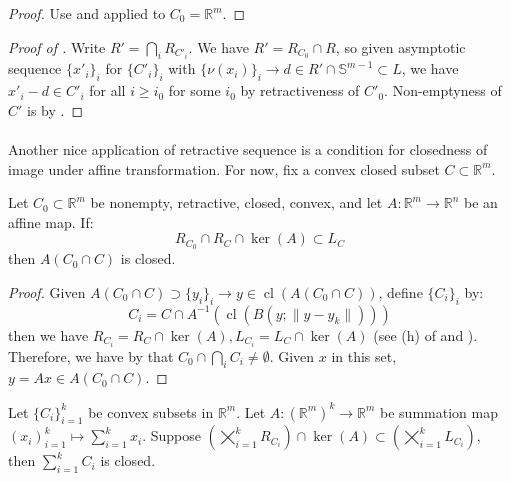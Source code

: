 \begin{proof}
	Use  and  applied to $C_0=\mathbb{R}^m$.
\end{proof}

\begin{proof}[Proof of ]
	Write $R'=\bigcap_iR_{C'_i}$. We have $R'=R_{C_0}\cap R$, so given asymptotic sequence $\{x'_i\}_i$ for $\{C'_i\}_i$ with $\{\nu(x_i)\}_i\to d\in R'\cap \mathbb{S}^{m-1}\subset L$, we have $x'_i-d\in C'_i$ for all $i\geq i_0$ for some $i_0$ by retractiveness of $C'_0$. Non-emptyness of $C'$ is by .
\end{proof}

\paragraph{}Another nice application of retractive sequence is a condition for closedness of image under affine transformation. For now, fix a convex closed subset $C\subset \mathbb{R}^m$.

\begin{coro}\label{coro:013-closed-affine}
	Let $C_0\subset \mathbb{R}^m$ be nonempty, retractive, closed, convex, and let $A:\mathbb{R}^m\to \mathbb{R}^n$ be an affine map. If:
	\[
		R_{C_0}\cap R_C\cap \operatorname{ker}(A)\subset L_C
	\]
	then $A(C_0\cap C)$ is closed.
\end{coro}

\begin{proof}
	Given $A(C_0\cap C)\supset\{y_i\}_{i}\to y\in \operatorname{cl}(A(C_0\cap C))$, define $\{C_i\}_i$ by:
	\[
		C_i=C\cap A^{-1}\left(\operatorname{cl}\left(B(y;\|y-y_k\|) \right)\right)
	\]
	then we have $R_{C_i}=R_C\cap \operatorname{ker}(A),L_{C_i}=L_C\cap \operatorname{ker}(A)$ (see (h) of  and ). Therefore, we have by  that $C_0\cap \bigcap_iC_i\neq\emptyset$. Given $x$ in this set, $y=Ax\in A(C_0\cap C)$.
\end{proof}

\begin{coro}\label{coro:013-closed-sum}
	Let $\{C_i\}_{i=1}^k$ be convex subsets in $\mathbb{R}^m$. Let $A:(\mathbb{R}^{m})^k\to \mathbb{R}^m$ be summation map $(x_i)_{i=1}^k\mapsto \sum_{i=1}^kx_i$. Suppose $\left(\bigtimes_{i=1}^kR_{C_i}\right)\cap\operatorname{ker}(A)\subset \left(\bigtimes_{i=1}^kL_{C_i}\right)$, then $\sum_{i=1}^kC_i$ is closed.
\end{coro}

